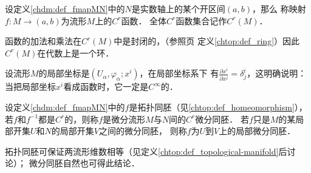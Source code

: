 \begin{definition}\label{chdm:def_func}
    设定义\ref{chdm:def_fmapMN}中的$N$是实数轴上的某个开区间$(a,b)$，那么
    称映射$f:M \to (a,b)$为流形$M$上的$C^r${\heiti 函数}．
    全体$C^r$函数集合记作$C^r(M)$．
\end{definition}
函数的加法和乘法在$C^r(M)$中是封闭的，（参照\pageref{chtop:def_ring}页
定义\ref{chtop:def_ring}）因此$C^r(M)$在代数上是一个{\kaishu 环}．


\begin{example}
    设流形$M$的局部坐标是$(U_\alpha,\varphi_\alpha;x^i)$，在局部坐标系下
    有$\frac{\partial x^i}{\partial x^j}=\delta^i_j$，这明确说明：
    当把局部坐标$x^i$看成函数时，它一定是$C^\infty$的．
\end{example}

\begin{definition}\label{chdm:def_Diff-Homeomorphism}
    设定义\ref{chdm:def_fmapMN}中的$f$是拓扑同胚（见\ref{chtop:def_homeomorphism}），
    若$f$和$f^{-1}$都是$C^r$的，则称$f$是微分流形$M$与$N$间的$C^r${\heiti 微分同胚}．
    若$f$只是$M$的某局部开集$U$和$N$的局部开集$V$之间的微分同胚，
    则称$f$为$U$到$V$上的{\heiti 局部微分同胚}．
\end{definition}
拓扑同胚可保证两流形维数相等（见定义\ref{chtop:def_topological-manifold}后讨论）；
微分同胚自然也可得此结论．


